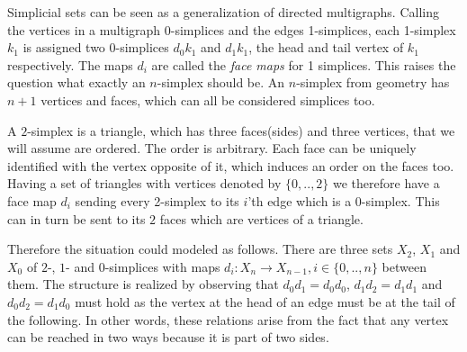 \documentclass[../../main.tex]{subfiles}
\begin{document}
    
    Simplicial sets can be seen as a generalization of directed multigraphs. Calling the vertices in a multigraph 0-simplices and the edges 1-simplices, each 1-simplex $k_1$ is assigned two 0-simplices $d_0k_1$ and $d_1k_1$, the head and tail vertex of $k_1$ respectively. The maps $d_i$ are called the \emph{face maps} for 1 simplices. This raises the question what exactly an $n$-simplex should be. An $n$-simplex from geometry has $n+1$ vertices and faces, which can all be considered simplices too.

    \begin{example}[2-simplex]
        A $2$-simplex is a triangle, which has three faces(sides) and three vertices, that we will assume are ordered. The order is arbitrary. Each face can be uniquely identified with the vertex opposite of it, which induces an order on the faces too. Having a set of triangles with vertices denoted by $\{0,..,2\}$ we therefore have a face map $d_i$ sending every 2-simplex to its $i$'th edge which is a $0$-simplex. This can in turn be sent to its $2$ faces which are vertices of a triangle. 
        
        Therefore the situation could modeled as follows. There are three sets $X_2$, $X_1$ and $X_0$ of $2$-, $1$- and $0$-simplices with maps $d_i: X_n \to X_{n-1}, i \in \{0,.., n\}$ between them. The structure is realized by observing that $d_0d_1 = d_0d_0$, $d_1d_2 = d_1d_1$ and $d_0d_2 = d_1d_0$ must hold as the vertex at the head of an edge must be at the tail of the following. In other words, these relations arise from the fact that any vertex can be reached in two ways because it is part of two sides.

        \begin{figure}[H]
            \begin{subfigure}[b]{0.3\textwidth}
            \end{subfigure}
        \end{figure}
    \end{example}
\end{document}
